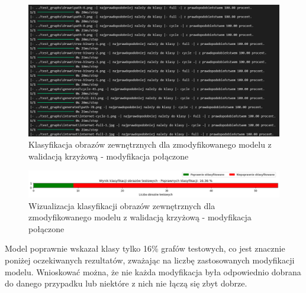 \begin{figure}[ht]
	\centering
	\includegraphics[width=14cm]{resources/tests/images/v4/crossvalid_txt.png}
	\caption{Klasyfikacja obrazów zewnętrznych dla zmodyfikowanego modelu z walidacją krzyżową - modyfikacja połączone}
	\label{Fig:tests-cv-5b}
\end{figure}
\FloatBarrier

\begin{figure}[ht]
	\centering
	\includegraphics[width=14cm]{resources/tests/images/v4/crossvalid_bar.png}
	\caption{Wizualizacja klasyfikacji obrazów zewnętrznych dla zmodyfikowanego modelu z walidacją krzyżową - modyfikacja połączone}
	\label{Fig:tests-cv-5c}
\end{figure}
\FloatBarrier

Model poprawnie wskazał klasy tylko 16\% grafów testowych, co jest znacznie poniżej oczekiwanych rezultatów,
zważając na liczbę zastosowanych modyfikacji modelu.
Wnioskować można, że nie każda modyfikacja była odpowiednio dobrana do danego przypadku
lub niektóre z nich nie łączą się zbyt dobrze.